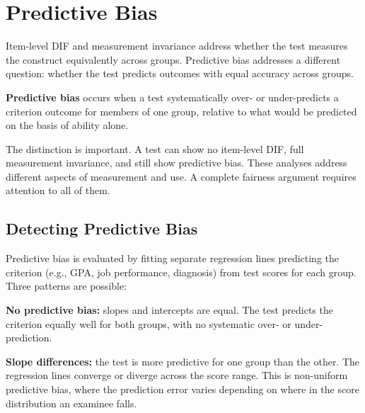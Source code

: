 \documentclass[
  11pt,
  letterpaper,
]{scrbook}
\begin{document}
\section{Predictive Bias}\label{predictive-bias}

Item-level DIF and measurement invariance address whether the test
measures the construct equivalently across groups. Predictive bias
addresses a different question: whether the test predicts outcomes with
equal accuracy across groups.

\begin{tcolorbox}[enhanced jigsaw, colback=white, toprule=.15mm, colbacktitle=quarto-callout-note-color!10!white, left=2mm, leftrule=.75mm, opacitybacktitle=0.6, colframe=quarto-callout-note-color-frame, rightrule=.15mm, bottomtitle=1mm, opacityback=0, titlerule=0mm, toptitle=1mm, breakable, bottomrule=.15mm, coltitle=black, title=\textcolor{quarto-callout-note-color}{\faInfo}\hspace{0.5em}{Note}, arc=.35mm]

\textbf{Predictive bias} occurs when a test systematically over- or
under-predicts a criterion outcome for members of one group, relative to
what would be predicted on the basis of ability alone.

\end{tcolorbox}

The distinction is important. A test can show no item-level DIF, full
measurement invariance, and still show predictive bias. These analyses
address different aspects of measurement and use. A complete fairness
argument requires attention to all of them.

\subsection{Detecting Predictive Bias}\label{detecting-predictive-bias}

Predictive bias is evaluated by fitting separate regression lines
predicting the criterion (e.g., GPA, job performance, diagnosis) from
test scores for each group. Three patterns are possible:

\textbf{No predictive bias:} slopes and intercepts are equal. The test
predicts the criterion equally well for both groups, with no systematic
over- or under-prediction.

\textbf{Slope differences:} the test is more predictive for one group
than the other. The regression lines converge or diverge across the
score range. This is non-uniform predictive bias, where the prediction
error varies depending on where in the score distribution an examinee
falls.
\end{document}
